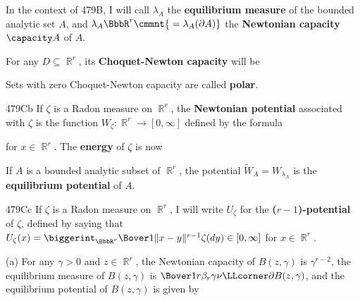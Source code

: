  In the context of 479B, I will call
$\lambda_A$ the {\bf equilibrium measure} of the bounded analytic set
$A$, and $\lambda_A\BbbR^r\cmmnt{\mskip5mu=\lambda_A(\partial A)}$ the
{\bf Newtonian capacity} $\capacity A$ of $A$.

\medskip

 For any $D\subseteq\BbbR^r$, its {\bf Choquet-Newton
capacity} will be


\noindent{}Sets with zero
Choquet-Newton capacity are called {\bf polar}.

\spheader 479Cb If $\zeta$ is a Radon
measure on $\BbbR^r$, the {\bf Newtonian potential} associated with
$\zeta$ is
the function $W_{\zeta}:\BbbR^r\to[0,\infty]$ defined by the formula


\noindent for $x\in\BbbR^r$.   The {\bf energy} of $\zeta$ is now


\noindent If $A$ is a bounded analytic subset of $\BbbR^r$, the potential
$\tilde W_A=W_{\lambda_A}$ is the {\bf equilibrium potential} of $A$.


\spheader 479Cc If $\zeta$ is a Radon measure on $\BbbR^r$,
I will write $U_{\zeta}$ for the
{\bf ($r-1$)-potential} of $\zeta$, defined by saying that
$U_{\zeta}(x)
=\biggerint_{\BbbR^r}\Bover1{\|x-y\|^{r-1}}\zeta(dy)\in[0,\infty]$ for
$x\in\BbbR^r$.

(a) For any $\gamma>0$ and $z\in\BbbR^r$,
the Newtonian capacity of
$B(z,\gamma)$ is $\gamma^{r-2}$, the equilibrium measure
of $B(z,\gamma)$ is
$\Bover1{r\beta_r\gamma}\nu\LLcorner\partial B(z,\gamma)$, and the
equilibrium potential of $B(z,\gamma)$ is given by


